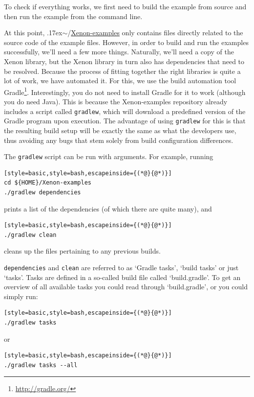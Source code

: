 \documentclass[12pt, a4paper, twoside, openany, titlepage]{book}
\newcommand{\mytilde}{\raise.17ex\hbox{$\scriptstyle\sim$}}
\begin{document}
To check if everything works, we first need to build the example from source and then run the example from the command line.

At this point, \mytilde/\url{Xenon-examples} only contains files directly related to the source code of the example files. However, in order to build and run the examples successfully, we'll need a few more things. Naturally, we'll need a copy of the Xenon library, but the Xenon library in turn also has dependencies that need to be resolved. Because the process of fitting together the right libraries is quite a lot of work, we have automated it. For this, we use the build automation tool Gradle\footnote{\url{http://gradle.org/}}. Interestingly, you do not need to install Gradle for it to work (although you do need Java). This is because the Xenon-examples repository already includes a script called \texttt{gradlew}, which will download a predefined version of the Gradle program upon execution. The advantage of using \texttt{gradlew} for this is that the resulting build setup will be exactly the same as what the developers use, thus avoiding any bugs that stem solely from build configuration differences.

The \texttt{gradlew} script can be run with arguments. For example, running
\begin{lstlisting}[style=basic,style=bash,escapeinside={(*@}{@*)}]
cd ${HOME}/Xenon-examples
./gradlew dependencies
\end{lstlisting} %
prints a list of the dependencies (of which there are quite many), and

\begin{lstlisting}[style=basic,style=bash,escapeinside={(*@}{@*)}]
./gradlew clean
\end{lstlisting} %
cleans up the files pertaining to any previous builds.

\texttt{dependencies} and \texttt{clean} are referred to as `Gradle tasks', `build tasks' or just `tasks'. Tasks are defined in a so-called build file called `build.gradle'. To get an overview of all available tasks you could read through `build.gradle', or you could simply run:
\begin{lstlisting}[style=basic,style=bash,escapeinside={(*@}{@*)}]
./gradlew tasks
\end{lstlisting} %

or

\begin{lstlisting}[style=basic,style=bash,escapeinside={(*@}{@*)}]
./gradlew tasks --all
\end{lstlisting} %
\end{document}
